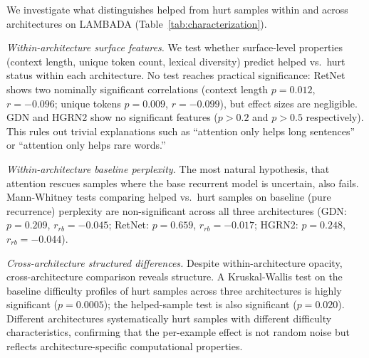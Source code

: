 \documentclass[11pt]{article}
\begin{document}
We investigate what distinguishes helped from hurt samples within and across architectures on LAMBADA (Table~\ref{tab:characterization}).

\textit{Within-architecture surface features.}
We test whether surface-level properties (context length, unique token count, lexical diversity) predict helped vs.\ hurt status within each architecture.
No test reaches practical significance: RetNet shows two nominally significant correlations (context length $p = 0.012$, $r = {-}0.096$; unique tokens $p = 0.009$, $r = {-}0.099$), but effect sizes are negligible.
GDN and HGRN2 show no significant features ($p > 0.2$ and $p > 0.5$ respectively).
This rules out trivial explanations such as ``attention only helps long sentences'' or ``attention only helps rare words.''

\textit{Within-architecture baseline perplexity.}
The most natural hypothesis, that attention rescues samples where the base recurrent model is uncertain, also fails.
Mann-Whitney tests comparing helped vs.\ hurt samples on baseline (pure recurrence) perplexity are non-significant across all three architectures (GDN: $p = 0.209$, $r_{rb} = {-}0.045$; RetNet: $p = 0.659$, $r_{rb} = {-}0.017$; HGRN2: $p = 0.248$, $r_{rb} = {-}0.044$).

\textit{Cross-architecture structured differences.}
Despite within-architecture opacity, cross-architecture comparison reveals structure.
A Kruskal-Wallis test on the baseline difficulty profiles of hurt samples across three architectures is highly significant ($p = 0.0005$); the helped-sample test is also significant ($p = 0.020$).
Different architectures systematically hurt samples with different difficulty characteristics, confirming that the per-example effect is not random noise but reflects architecture-specific computational properties.
\end{document}
